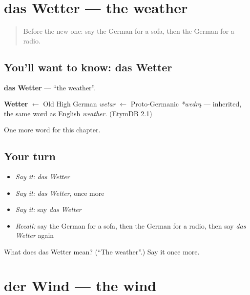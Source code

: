 \section[das Wetter]{das Wetter — the weather}

\label{lesson:GE-C162-wetter}



\begin{quote}
Before the new one: say the German for a sofa, then the German for a radio.
\end{quote}

\subsection*{You'll want to know: das Wetter}
\textbf{das Wetter} — \textquotedblleft{}the weather\textquotedblright{}.

\begin{cousinweb}
\textbf{Wetter} $\leftarrow$ Old High German \emph{wetar} $\leftarrow$ Proto-Germanic \emph{*wedrą} — inherited, the same word as English \emph{weather}. (EtymDB 2.1)
\end{cousinweb}

\begin{grammarlens}[title={What you've built}]
One more word for this chapter.
\end{grammarlens}

\subsection*{Your turn}
\begin{itemize}
\raggedright
  \item \emph{Say it:} \emph{das Wetter}
  \item \emph{Say it:} \emph{das Wetter}, once more
  \item \emph{Say it:} say \emph{das Wetter}
  \item \emph{Recall:} say the German for a sofa, then the German for a radio, then say \emph{das Wetter} again
\end{itemize}

\begin{tcolorbox}[breakable,colback=teal!4,colframe=teal!35!black,title={Before you move on}]
What does das Wetter mean? (\textquotedblleft{}The weather\textquotedblright{}.) Say it once more.
\end{tcolorbox}
\section[der Wind]{der Wind — the wind}

